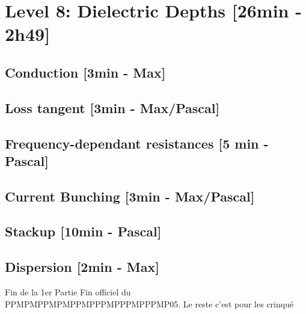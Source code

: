 

\section{Level 8: Dielectric Depths [26min - 2h49]}
\subsection{Conduction [3min - Max]}
\subsection{Loss tangent [3min - Max/Pascal]}
\subsection{Frequency-dependant resistances [5 min - Pascal]}
\subsection{Current Bunching [3min - Max/Pascal]}
\subsection{Stackup [10min - Pascal]}
\subsection{Dispersion [2min - Max]}

\begin{frame}{Fin de la 1er Partie}
    \color{white}
    Fin officiel du PPMPMPPMPMPPMPPPMPPPMPPPMP05. Le reste c'est pour les crinqué
\end{frame}